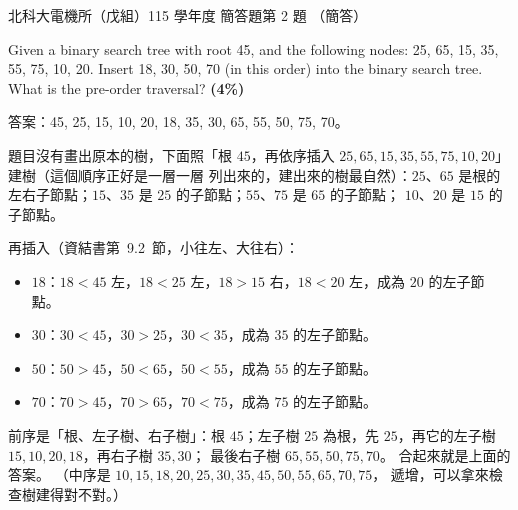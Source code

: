 \begin{pastexam}[label={px:ntut-115-ee-ds-17}]{北科大電機所（戊組）115 學年度 簡答題第 2 題}
（簡答）

Given a binary search tree with root 45, and the following nodes: 25, 65, 15, 35, 55, 75, 10, 20.
Insert 18, 30, 50, 70 (in this order) into the binary search tree. What is the pre-order traversal?
\textbf{(4\%)}
\end{pastexam}

\begin{pastsoln}
答案：45, 25, 15, 10, 20, 18, 35, 30, 65, 55, 50, 75, 70。

題目沒有畫出原本的樹，下面照「根 $45$，再依序插入 $25, 65, 15, 35, 55, 75, 10, 20$」建樹（這個順序正好是一層一層
列出來的，建出來的樹最自然）：$25$、$65$ 是根的左右子節點；$15$、$35$ 是 $25$ 的子節點；$55$、$75$ 是 $65$ 的子節點；
$10$、$20$ 是 $15$ 的子節點。

再插入（資結書第~9.2~節，小往左、大往右）：
\begin{itemize}
\item $18$：$18 < 45$ 左，$18 < 25$ 左，$18 > 15$ 右，$18 < 20$ 左，成為 $20$ 的左子節點。
\item $30$：$30 < 45$，$30 > 25$，$30 < 35$，成為 $35$ 的左子節點。
\item $50$：$50 > 45$，$50 < 65$，$50 < 55$，成為 $55$ 的左子節點。
\item $70$：$70 > 45$，$70 > 65$，$70 < 75$，成為 $75$ 的左子節點。
\end{itemize}
\begin{center}
\end{center}
前序是「根、左子樹、右子樹」：根 $45$；左子樹 $25$ 為根，先 $25$，再它的左子樹 $15, 10, 20, 18$，再右子樹 $35, 30$；
最後右子樹 $65, 55, 50, 75, 70$。 合起來就是上面的答案。 （中序是 $10, 15, 18, 20, 25, 30, 35, 45, 50, 55, 65, 70, 75$，
遞增，可以拿來檢查樹建得對不對。）
\end{pastsoln}
